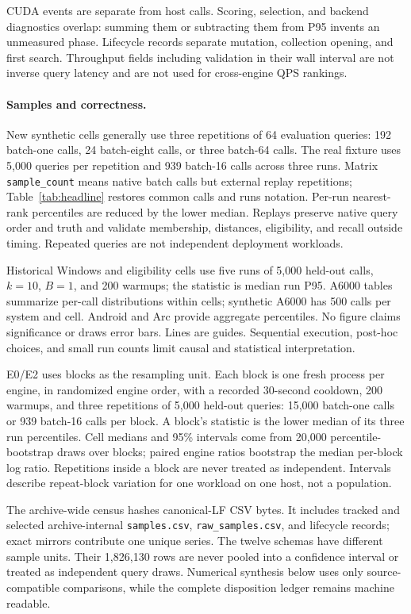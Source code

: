 \documentclass[10pt]{article}
\begin{document}
CUDA events are separate from host calls. Scoring, selection, and backend diagnostics overlap: summing them or subtracting them from P95 invents an unmeasured phase. Lifecycle records separate mutation, collection opening, and first search. Throughput fields including validation in their wall interval are not inverse query latency and are not used for cross-engine QPS rankings.

\paragraph{Samples and correctness.}
New synthetic cells generally use three repetitions of 64 evaluation queries: 192 batch-one calls, 24 batch-eight calls, or three batch-64 calls. The real fixture uses 5,000 queries per repetition and 939 batch-16 calls across three runs. Matrix \texttt{sample\_count} means native batch calls but external replay repetitions; Table~\ref{tab:headline} restores common calls and runs notation. Per-run nearest-rank percentiles are reduced by the lower median. Replays preserve native query order and truth and validate membership, distances, eligibility, and recall outside timing. Repeated queries are not independent deployment workloads.

Historical Windows and eligibility cells use five runs of 5,000 held-out calls, $k=10$, $B=1$, and 200 warmups; the statistic is median run P95. A6000 tables summarize per-call distributions within cells; synthetic A6000 has 500 calls per system and cell. Android and Arc provide aggregate percentiles. No figure claims significance or draws error bars. Lines are guides. Sequential execution, post-hoc choices, and small run counts limit causal and statistical interpretation.

E0/E2 uses blocks as the resampling unit. Each block is one fresh process per engine, in randomized engine order, with a recorded 30-second cooldown, 200 warmups, and three repetitions of 5,000 held-out queries: 15,000 batch-one calls or 939 batch-16 calls per block. A block's statistic is the lower median of its three run percentiles. Cell medians and 95\% intervals come from 20,000 percentile-bootstrap draws over blocks; paired engine ratios bootstrap the median per-block log ratio. Repetitions inside a block are never treated as independent. Intervals describe repeat-block variation for one workload on one host, not a population.

The archive-wide census hashes canonical-LF CSV bytes. It includes tracked and selected archive-internal \texttt{samples.csv}, \texttt{raw\_samples.csv}, and lifecycle records; exact mirrors contribute one unique series. The twelve schemas have different sample units. Their 1,826,130 rows are never pooled into a confidence interval or treated as independent query draws. Numerical synthesis below uses only source-compatible comparisons, while the complete disposition ledger remains machine readable.
\end{document}
